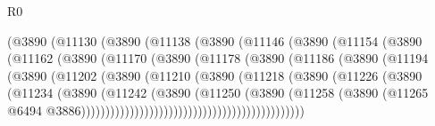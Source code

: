 \begin{lexlean}{R0}
\begin{coremodule}
                        (@3890
                          (@11130
                            (@3890
                              (@11138
                                (@3890
                                  (@11146
                                    (@3890
                                      (@11154
                                        (@3890
                                          (@11162
                                            (@3890
                                              (@11170
                                                (@3890
                                                  (@11178
                                                    (@3890
                                                      (@11186
                                                        (@3890
                                                          (@11194
                                                            (@3890
                                                              (@11202
                                                                (@3890
                                                                  (@11210
                                                                    (@3890
                                                                      (@11218
                                                                        (@3890
                                                                          (@11226
                                                                            (@3890
                                                                              (@11234
                                                                                (@3890
                                                                                  (@11242
                                                                                    (@3890
                                                                                      (@11250
                                                                                        (@3890
                                                                                          (@11258
                                                                                            (@3890
                                                                                              (@11265
                                                                                                @6494
                                                                                                @3886))))))))))))))))))))))))))))))))))))))))))))))

\end{coremodule}
\end{lexlean}
